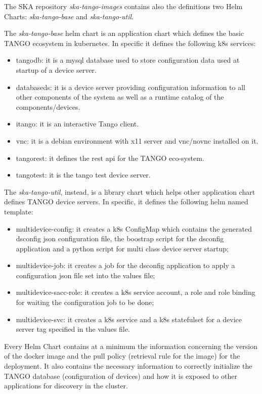 \documentclass[a4paper,
               keeplastbox,   %
               ]{jacow}
\begin{document}
The SKA repository \textit{ska-tango-images} contains also the definitions two Helm Charts: \textit{ska-tango-base} and \textit{ska-tango-util}.

The \textit{ska-tango-base} helm chart is an application chart which defines the basic TANGO ecosystem in kubernetes. In specific it defines the following k8s services:
\begin{itemize}
    \item tangodb: it is a mysql database used to store configuration data used at startup of a device server.
    \item databaseds: it is a device server providing configuration information to all other components of the system as well as a runtime catalog of the components/devices.
    \item itango: it is an interactive Tango client.
    \item vnc: it is a debian environment with x11 server and vnc/novnc installed on it.
    \item tangorest: it defines the rest api for the TANGO eco-system.
    \item tangotest: it is the tango test device server.
\end{itemize}

The \textit{ska-tango-util}, instead, is a library chart which helps other application chart defines TANGO device servers. In specific, it defines the following helm named template:
\begin{itemize}
    \item multidevice-config: it creates a k8s ConfigMap which contains the generated dsconfig json configuration file, the boostrap script for the dsconfig application and a python script for multi class device server startup;
    \item multidevice-job: it creates a job for the dsconfig application to apply a configuration json file set into the values file;
    \item multidevice-sacc-role: it creates a k8s service account, a role and role binding for waiting the configuration job to be done;
    \item multidevice-svc: it creates a k8s service and a k8s statefulset for a device server tag specified in the values file.
\end{itemize}

Every Helm Chart contains at a minimum the information concerning the version of the docker image and the pull policy (retrieval rule for the image) for the deployment. It also contains the necessary information to correctly initialize the TANGO database (configuration of devices) and how it is exposed to other applications for discovery in the cluster.
\end{document}
